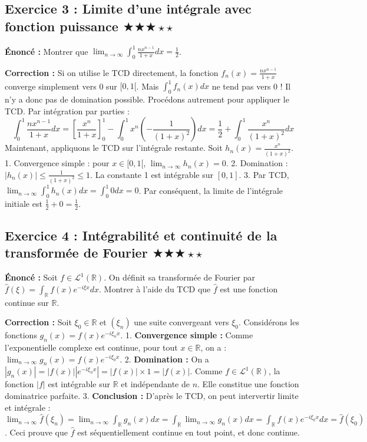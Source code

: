 \documentclass[11pt,a4paper]{article}
\begin{document}
\subsection*{Exercice 3 : Limite d'une intégrale avec fonction puissance \quad $\bigstar\bigstar\bigstar\star\star$}

\textbf{Énoncé :}
Montrer que $\lim_{n \to \infty} \int_0^1 \frac{n x^{n-1}}{1 + x} dx = \frac{1}{2}$.

\textbf{Correction :}
Si on utilise le TCD directement, la fonction $f_n(x) = \frac{n x^{n-1}}{1 + x}$ converge simplement vers 0 sur $[0, 1[$. Mais $\int_0^1 f_n(x) dx$ ne tend pas vers 0 ! Il n'y a donc pas de domination possible.
Procédons autrement pour appliquer le TCD.
Par intégration par parties :
$$ \int_0^1 \frac{n x^{n-1}}{1 + x} dx = \left[ \frac{x^n}{1+x} \right]_0^1 - \int_0^1 x^n \left(-\frac{1}{(1+x)^2}\right) dx = \frac{1}{2} + \int_0^1 \frac{x^n}{(1+x)^2} dx $$
Maintenant, appliquons le TCD sur l'intégrale restante.
Soit $h_n(x) = \frac{x^n}{(1+x)^2}$.
1. Convergence simple : pour $x \in [0, 1[$, $\lim_{n \to \infty} h_n(x) = 0$.
2. Domination : $|h_n(x)| \le \frac{1}{(1+x)^2} \le 1$. La constante 1 est intégrable sur $[0, 1]$.
3. Par TCD, $\lim_{n \to \infty} \int_0^1 h_n(x) dx = \int_0^1 0 dx = 0$.
Par conséquent, la limite de l'intégrale initiale est $\frac{1}{2} + 0 = \frac{1}{2}$.


\subsection*{Exercice 4 : Intégrabilité et continuité de la transformée de Fourier \quad $\bigstar\bigstar\bigstar\star\star$}

\textbf{Énoncé :}
Soit $f \in \mathcal{L}^1(\mathbb{R})$. On définit sa transformée de Fourier par $\hat{f}(\xi) = \int_{\mathbb{R}} f(x) e^{-i \xi x} dx$.
Montrer à l'aide du TCD que $\hat{f}$ est une fonction continue sur $\mathbb{R}$.

\textbf{Correction :}
Soit $\xi_0 \in \mathbb{R}$ et $(\xi_n)$ une suite convergeant vers $\xi_0$.
Considérons les fonctions $g_n(x) = f(x) e^{-i \xi_n x}$.
1. \textbf{Convergence simple :} Comme l'exponentielle complexe est continue, pour tout $x \in \mathbb{R}$, on a :
   $\lim_{n \to \infty} g_n(x) = f(x) e^{-i \xi_0 x}$.
2. \textbf{Domination :} On a $|g_n(x)| = |f(x)| |e^{-i \xi_n x}| = |f(x)| \times 1 = |f(x)|$.
   Comme $f \in \mathcal{L}^1(\mathbb{R})$, la fonction $|f|$ est intégrable sur $\mathbb{R}$ et indépendante de $n$. Elle constitue une fonction dominatrice parfaite.
3. \textbf{Conclusion :} D'après le TCD, on peut intervertir limite et intégrale :
   $\lim_{n \to \infty} \hat{f}(\xi_n) = \lim_{n \to \infty} \int_{\mathbb{R}} g_n(x) dx = \int_{\mathbb{R}} \lim_{n \to \infty} g_n(x) dx = \int_{\mathbb{R}} f(x) e^{-i \xi_0 x} dx = \hat{f}(\xi_0)$.
   Ceci prouve que $\hat{f}$ est séquentiellement continue en tout point, et donc continue.
\end{document}
